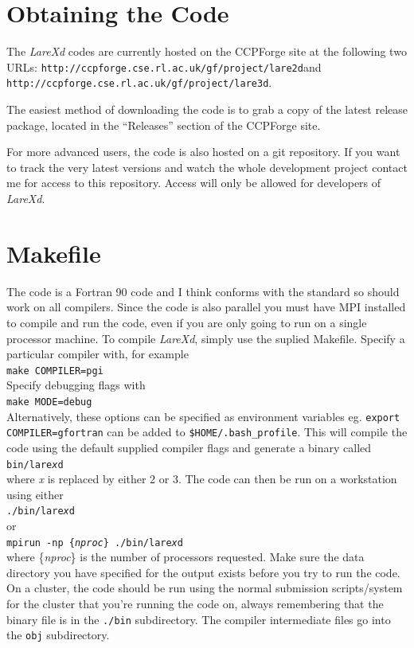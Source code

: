 \documentclass[11pt]{article}
\begin{document}
\section{Obtaining the Code}
The {\it LareXd} codes are currently hosted on the CCPForge site at
the following two URLs:\linebreak
{\tt http://ccpforge.cse.rl.ac.uk/gf/project/lare2d}\linebreak and
{\tt http://ccpforge.cse.rl.ac.uk/gf/project/lare3d}.

The easiest method of downloading the code is to grab a copy of the latest
release package, located in the ``Releases'' section of the CCPForge site.

For more advanced users, the code is also hosted on a git repository. If you want to track the very
latest versions and watch the whole development project contact me for access to this repository.
Access will only be allowed for developers of {\it LareXd}.

\section{Makefile}

The code is a Fortran 90 code and I think conforms with the standard so should work on all compilers. Since the code 
is also parallel you must have MPI installed to compile and run the code, even if you are only going to run on a single processor machine.
To compile {\it LareXd}, simply use the suplied Makefile. Specify a particular compiler with, for example \\
\texttt{make COMPILER=pgi}\\
Specify debugging flags with\\ 
\texttt{make MODE=debug}\\
Alternatively, these options can be specified as environment variables
eg. \texttt{export COMPILER=gfortran} can be added to \texttt{\$HOME/.bash\_profile}.
This will compile the code using the default supplied compiler flags and generate a binary called\\
\texttt{bin/lare{\it x}d}\\
where {\it x} is replaced by either 2 or 3. The code can then be run on a workstation using either\\
\texttt{./bin/lare{\it x}d}\\
or\\
\texttt{mpirun -np \{{\it nproc}\} ./bin/lare{\it x}d}\\
where \{{\it nproc}\} is the number of processors requested. Make sure the data directory you have specified for the output exists
before you try to run the code. On a cluster, the
code should be run using the normal submission scripts/system for the cluster
that you're running the code on, always remembering that the binary file is in
the \texttt{./bin} subdirectory. The compiler intermediate files go into the
\texttt{obj} subdirectory. \\
\end{document}
